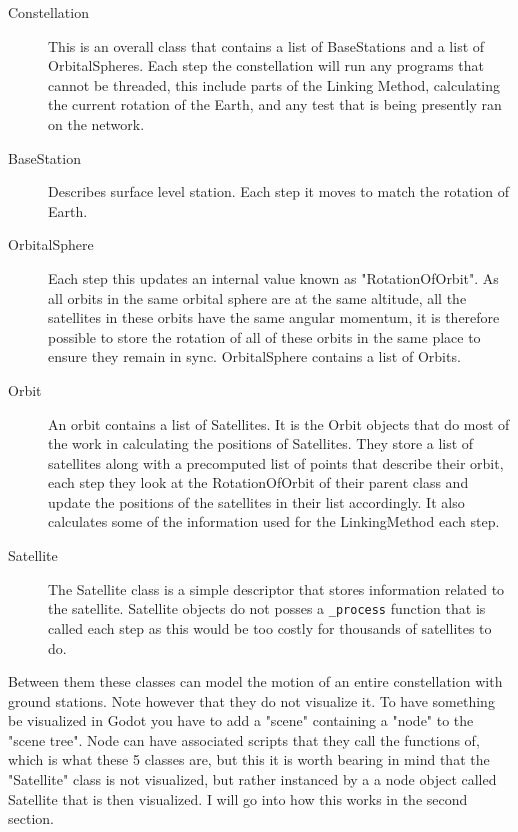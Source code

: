 \documentclass[12pt]{report}
\begin{document}
\begin{description}
\item[Constellation] This is an overall class that contains a list of BaseStations and a list of OrbitalSpheres. Each step the constellation will run any programs that cannot be threaded, this include parts of the Linking Method, calculating the current rotation of the Earth, and any test that is being presently ran on the network.
\item[BaseStation] Describes  surface level station. Each step it moves to match the rotation of Earth.
\item[OrbitalSphere] Each step this updates an internal value known as "RotationOfOrbit". As all orbits in the same orbital sphere are at the same altitude, all the satellites in these orbits have the same angular momentum, it is therefore possible to store the rotation of all of these orbits in the same place to ensure they remain in sync. OrbitalSphere contains a list of Orbits.
\item[Orbit] An orbit contains a list of Satellites. It is the Orbit objects that do most of the work in calculating the positions of Satellites. They store a list of satellites along with a precomputed list of points that describe their orbit, each step they look at the RotationOfOrbit of their parent class and update the positions of the satellites in their list accordingly. It also calculates some of the information used for the LinkingMethod each step.
\item[Satellite] The Satellite class is a simple descriptor that stores information related to the satellite. Satellite objects do not posses a \lstinline{_process} function that is called each step as this would be too costly for thousands of satellites to do.
\end{description}

Between them these classes can model the motion of an entire constellation with ground stations. Note however that they do not visualize it. To have something be visualized in Godot you have to add a "scene" containing a "node" to the "scene tree". Node can have associated scripts that they call the functions of, which is what these 5 classes are, but this it is worth bearing in mind that the "Satellite" class is not visualized, but rather instanced by a a node object called Satellite that is then visualized. I will go into how this works in the second section.

\end{document}
